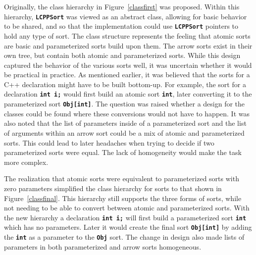 \documentclass[12pt]{article} %
\newcommand{\reserved}[1]{\textbf{\texttt{#1}}} %
\begin{document}
Originally, the class hierarchy in Figure~\ref{classfirst} was
proposed. Within this hierarchy, \reserved{LCPPSort} was viewed as an abstract
class, allowing for basic behavior to be shared, and so that the
implementation could use \reserved{LCPPSort} pointers to hold any type of
sort. The class structure represents the feeling that atomic sorts are
basic and parameterized sorts build upon them. The arrow sorts exist
in their own tree, but contain both atomic and parameterized
sorts. While this design captured the behavior of the various sorts
well, it was uncertain whether it would be practical in practice. As
mentioned earlier, it was believed that the sorts for a C++
declaration might have to be built bottom-up. For example, the sort
for a declaration \reserved{int i;} would first build an atomic sort
\reserved{int}, later converting it to the parameterized sort
\reserved{Obj[int]}. The question was raised whether a design for the
classes could be found where these conversions would not have to
happen. It was also noted that the list of parameters inside of a
parameterized sort and the list of arguments within an arrow sort could be a
mix of atomic and parameterized sorts. This could lead to 
later headaches when trying to decide if two parameterized sorts were
equal. The lack of homogeneity would make the task more complex.

The realization that atomic sorts were equivalent to parameterized
sorts with zero parameters simplified the class hierarchy for sorts to
that shown in Figure~\ref{classfinal}. This hierarchy still supports
the three forms of sorts, while not needing to be able to convert
between atomic and parameterized sorts. With the new hierarchy a
declaration \reserved{int i;} will first build a parameterized sort
\reserved{int} which has no parameters. Later it would create the
final sort \reserved{Obj[int]} by adding the \reserved{int} as a
parameter to the \reserved{Obj} sort. The change in design also made
lists of parameters in both parameterized and arrow sorts homogeneous.
\end{document}
